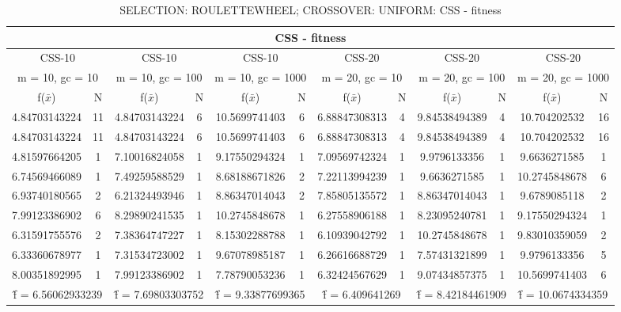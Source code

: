 \begin{table}[H]
	\centering
	\caption{SELECTION: ROULETTEWHEEL; CROSSOVER: UNIFORM: CSS - fitness}
	\begin{adjustbox}{width=1\textwidth}
		\begin{tabular}{ |c|c||c|c||c|c||c|c||c|c||c|c| }
			\hline
			\multicolumn{12}{|c|}{CSS - fitness} \\
			\hline
			\multicolumn{2}{|c||}{CSS-10} & \multicolumn{2}{c||}{CSS-10} & \multicolumn{2}{c||}{CSS-10} & \multicolumn{2}{c||}{CSS-20} & \multicolumn{2}{c||}{CSS-20} & \multicolumn{2}{c|}{CSS-20}\\
			\hline
			\multicolumn{2}{|c||}{m = 10, gc = 10} & \multicolumn{2}{c||}{m = 10, gc = 100} & \multicolumn{2}{c||}{m = 10, gc = 1000} & \multicolumn{2}{c||}{m = 20, gc = 10} & \multicolumn{2}{c||}{m = 20, gc = 100} & \multicolumn{2}{c|}{m = 20, gc = 1000}\\
			\hline
			f($\bar{x}$) & N & f($\bar{x}$) & N & f($\bar{x}$) & N & f($\bar{x}$) & N & f($\bar{x}$) & N & f($\bar{x}$) & N\\
			\hline
			\hline
			4.84703143224 & 11 & 4.84703143224 & 6 & 10.5699741403 & 6 & 6.88847308313 & 4 & 9.84538494389 & 4 & 10.704202532 & 16\\
			\hline
			4.84703143224 & 11 & 4.84703143224 & 6 & 10.5699741403 & 6 & 6.88847308313 & 4 & 9.84538494389 & 4 & 10.704202532 & 16\\
			4.81597664205 & 1 & 7.10016824058 & 1 & 9.17550294324 & 1 & 7.09569742324 & 1 & 9.9796133356 & 1 & 9.6636271585 & 1\\
			6.74569466089 & 1 & 7.49259588529 & 1 & 8.68188671826 & 2 & 7.22113994239 & 1 & 9.6636271585 & 1 & 10.2745848678 & 6\\
			6.93740180565 & 2 & 6.21324493946 & 1 & 8.86347014043 & 2 & 7.85805135572 & 1 & 8.86347014043 & 1 & 9.6789085118 & 2\\
			7.99123386902 & 6 & 8.29890241535 & 1 & 10.2745848678 & 1 & 6.27558906188 & 1 & 8.23095240781 & 1 & 9.17550294324 & 1\\
			6.31591755576 & 2 & 7.38364747227 & 1 & 8.15302288788 & 1 & 6.10939042792 & 1 & 10.2745848678 & 1 & 9.83010359059 & 2\\
			6.33360678977 & 1 & 7.31534723002 & 1 & 9.67078985187 & 1 & 6.26616688729 & 1 & 7.57431321899 & 1 & 9.9796133356 & 5\\
			8.00351892995 & 1 & 7.99123386902 & 1 & 7.78790053236 & 1 & 6.32424567629 & 1 & 9.07434857375 & 1 & 10.5699741403 & 6\\
			\hline
			\multicolumn{2}{|c||}{\^{f} = 6.56062933239} & \multicolumn{2}{c||}{\^{f} = 7.69803303752} & \multicolumn{2}{c||}{\^{f} = 9.33877699365} & \multicolumn{2}{c||}{\^{f} = 6.409641269} & \multicolumn{2}{c||}{\^{f} = 8.42184461909} & \multicolumn{2}{c|}{\^{f} = 10.0674334359}\\
			\hline
		\end{tabular}
	\end{adjustbox}
\end{table}
